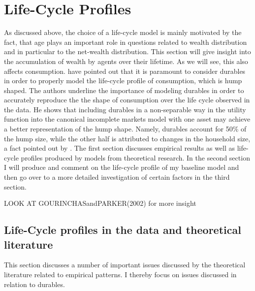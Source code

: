 \documentclass[a4paper,12pt]{article}
\begin{document}
\section{Life-Cycle Profiles}
As discussed above, the choice of a life-cycle model is mainly motivated by the fact, that age plays an important role in questions related to wealth distribution and in particular to the net-wealth distribution. This section will give insight into the accumulation of wealth by agents over their lifetime. As we will see, this also affects consumption. \cite{FV&K2011} have pointed out that it is paramount to consider durables in order to properly model the life-cycle profile of consumption, which is hump shaped. The authors underline the importance of modeling durables in order to accurately reproduce the the shape of consumption over the life cycle observed in the data. He shows that including durables in a non-separable way in the utility function into the canonical incomplete markets model with one asset may achieve a better representation of the hump shape. Namely, durables account for 50\% of the hump size, while the other half is attributed to changes in the household size, a fact pointed out by \cite{attanasio1999}. The first section discusses empirical results as well as life-cycle profiles produced by models from theoretical research. In the second section I will produce and comment on the life-cycle profile of my baseline model and then go over to a more detailed investigation of certain factors in the third section. 

LOOK AT GOURINCHASandPARKER(2002) for more insight

\subsection{Life-Cycle profiles in the data and theoretical literature}

This section discusses a number of important issues discussed by the theoretical literature related to empirical patterns. I thereby focus on issues discussed in relation to durables. 
\end{document}
